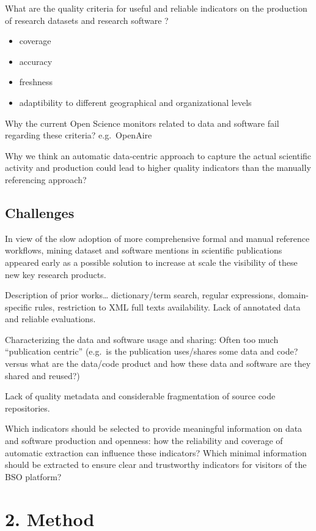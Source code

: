 \documentclass[
]{article}
\begin{document}
What are the quality criteria for useful and reliable indicators on the
production of research datasets and research software ?

\begin{itemize}
\item
  coverage
\item
  accuracy
\item
  freshness
\item
  adaptibility to different geographical and organizational levels
\end{itemize}

Why the current Open Science monitors related to data and software fail
regarding these criteria? e.g.~OpenAire

Why we think an automatic data-centric approach to capture the actual
scientific activity and production could lead to higher quality
indicators than the manually referencing approach?

\hypertarget{challenges}{%
\subsection{Challenges}\label{challenges}}

In view of the slow adoption of more comprehensive formal and manual
reference workflows, mining dataset and software mentions in scientific
publications appeared early as a possible solution to increase at scale
the visibility of these new key research products.

Description of prior works\ldots{} dictionary/term search, regular
expressions, domain-specific rules, restriction to XML full texts
availability. Lack of annotated data and reliable evaluations.

Characterizing the data and software usage and sharing: Often too much
``publication centric'' (e.g.~is the publication uses/shares some data
and code? versus what are the data/code product and how these data and
software are they shared and reused?)

Lack of quality metadata and considerable fragmentation of source code
repositories.

Which indicators should be selected to provide meaningful information on
data and software production and openness: how the reliability and
coverage of automatic extraction can influence these indicators? Which
minimal information should be extracted to ensure clear and trustworthy
indicators for visitors of the BSO platform?

\hypertarget{method}{%
\section{2. Method}\label{method}}
\end{document}
